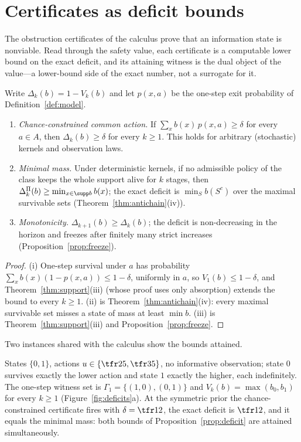 \section{Certificates as deficit bounds}\label{sec:deficit}

The obstruction certificates of the calculus prove that an information state is nonviable. Read through the safety value, each certificate is a computable lower bound on the exact deficit, and its attaining witness is the dual object of the value---a lower-bound side of the exact number, not a surrogate for it.

\begin{proposition}\label{prop:deficit}
Write $\Delta_k(b)=1-V_k(b)$ and let $p(x,a)$ be the one-step exit probability of Definition~\ref{def:model}.
\begin{enumerate}[leftmargin=1.6em,itemsep=1pt]
\item[(i)] \emph{Chance-constrained common action.} If $\sum_{x}b(x)\,p(x,a)\ge\delta$ for every $a\in A$, then $\Delta_k(b)\ge\delta$ for every $k\ge1$. This holds for arbitrary (stochastic) kernels and observation laws.
\item[(ii)] \emph{Minimal mass.} Under deterministic kernels, if no admissible policy of the class keeps the whole support alive for $k$ stages, then $\Delta^{\Pi}_k(b)\ge\min_{x\in\supp b}b(x)$; the exact deficit is $\min_S b(S^{c})$ over the maximal survivable sets (Theorem~\ref{thm:antichain}(iv)).
\item[(iii)] \emph{Monotonicity.} $\Delta_{k+1}(b)\ge\Delta_k(b)$; the deficit is non-decreasing in the horizon and freezes after finitely many strict increases (Proposition~\ref{prop:freeze}).
\end{enumerate}
\end{proposition}

\begin{proof}
(i) One-step survival under $a$ has probability $\sum_x b(x)(1-p(x,a))\le1-\delta$, uniformly in $a$, so $V_1(b)\le1-\delta$, and Theorem~\ref{thm:support}(iii) (whose proof uses only absorption) extends the bound to every $k\ge1$. (ii) is Theorem~\ref{thm:antichain}(iv): every maximal survivable set misses a state of mass at least $\min b$. (iii) is Theorem~\ref{thm:support}(iii) and Proposition~\ref{prop:freeze}.
\end{proof}

Two instances shared with the calculus show the bounds attained.

\begin{example}\label{ex:twofloor}
States $\{0,1\}$, actions $u\in\{\tfr25,\tfr35\}$, no informative observation; state $0$ survives exactly the lower action and state $1$ exactly the higher, each indefinitely. The one-step witness set is $\Gamma_1=\{(1,0),(0,1)\}$ and $V_k(b)=\max(b_0,b_1)$ for every $k\ge1$ (Figure~\ref{fig:deficits}a). At the symmetric prior the chance-constrained certificate fires with $\delta=\tfr12$, the exact deficit is $\tfr12$, and it equals the minimal mass: both bounds of Proposition~\ref{prop:deficit} are attained simultaneously.
\end{example}

